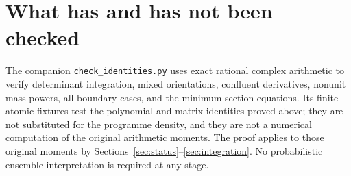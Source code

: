 \documentclass[11pt]{article}
\begin{document}
\section{What has and has not been checked}\label{sec:checks}

The companion \texttt{check\_identities.py} uses exact rational complex
arithmetic to verify determinant integration, mixed orientations,
confluent derivatives, nonunit mass powers, all boundary cases, and the
minimum-section equations. Its finite atomic fixtures test the
polynomial and matrix identities proved above; they are not substituted
for the programme density, and they are not a numerical computation of
the original arithmetic moments. The proof applies to those original
moments by Sections~\ref{sec:status}--\ref{sec:integration}.
No probabilistic ensemble interpretation is required at any stage.
\end{document}
